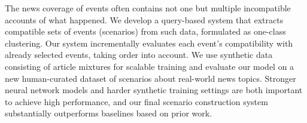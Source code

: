 The news coverage of events often contains not one but multiple incompatible accounts of what happened. We develop a query-based system that extracts compatible sets of events (scenarios) from such data, formulated as one-class clustering. Our system incrementally evaluates each event's compatibility with already selected events, taking order into account. We use synthetic data consisting of article mixtures for scalable training and evaluate our model on a new human-curated dataset of scenarios about real-world news topics. Stronger neural network models and harder synthetic training settings are both important to achieve high performance, and our final scenario construction system substantially outperforms baselines based on prior work.